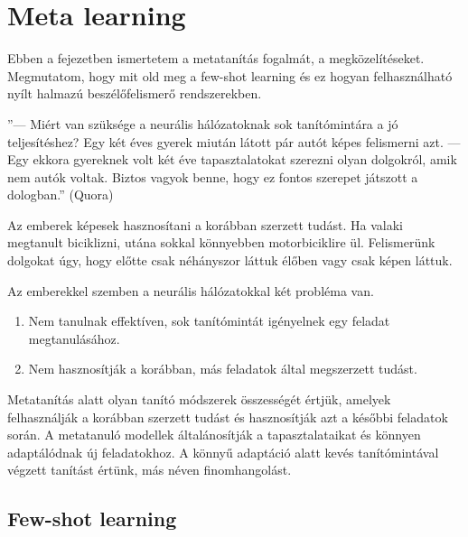 \chapter{Meta learning}

Ebben a fejezetben ismertetem a metatanítás fogalmát, a megközelítéseket. Megmutatom, hogy mit old meg a few-shot learning és ez hogyan felhasználható nyílt halmazú beszélőfelismerő rendszerekben.
	 

\begin{displayquote}
	''--- Miért van szüksége a neurális hálózatoknak sok tanítómintára a jó teljesítéshez? Egy két éves gyerek miután látott pár autót képes felismerni azt.
	--- Egy ekkora gyereknek volt két éve tapasztalatokat szerezni olyan dolgokról, amik nem autók voltak. Biztos vagyok benne, hogy ez fontos szerepet játszott a dologban.''\newline
	\null\hfill (Quora)
\end{displayquote}

Az emberek képesek hasznosítani a korábban szerzett tudást. Ha valaki megtanult biciklizni, utána sokkal
könnyebben motorbiciklire ül. Felismerünk dolgokat úgy, hogy előtte csak néhányszor láttuk élőben vagy csak képen láttuk.

Az emberekkel szemben a neurális hálózatokkal két probléma van.

\begin{enumerate}
	\item Nem tanulnak effektíven, sok tanítómintát igényelnek
	egy feladat megtanulásához.  
	\item Nem hasznosítják a korábban, más feladatok által megszerzett tudást.
\end{enumerate}



Metatanítás alatt olyan tanító módszerek
összességét értjük, amelyek felhasználják a korábban szerzett tudást és hasznosítják azt a későbbi
feladatok során. A metatanuló modellek általánosítják a tapasztalataikat és könnyen adaptálódnak új
feladatokhoz. A könnyű adaptáció alatt kevés tanítómintával végzett tanítást értünk, más néven finomhangolást.


\section{Few-shot learning}

